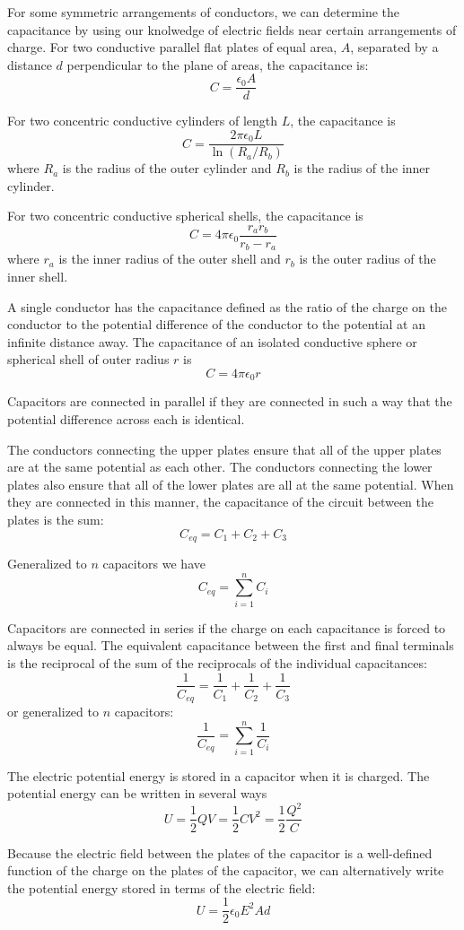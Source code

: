 \documentclass[../introphysics.tex]{subfiles}
\begin{document}
For some symmetric arrangements of conductors, we can determine the capacitance by using our knolwedge of electric fields near certain arrangements of charge.
For two conductive parallel flat plates of equal area, $A$, separated by a distance $d$ perpendicular to the plane of areas, the capacitance is:
\[C=\frac{\epsilon_0 A}{d}\]

For two concentric conductive cylinders of length $L$, the capacitance is
\[C=\frac{2\pi\epsilon_0 L}{\ln(R_a/R_b)}\]
where $R_a$ is the radius of the outer cylinder and $R_b$ is the radius of the inner cylinder.

For two concentric conductive spherical shells, the capacitance is 
\[C=4\pi\epsilon_0\frac{r_ar_b}{r_b-r_a}\]
where $r_a$ is the inner radius of the outer shell and $r_b$ is the outer radius of the inner shell.

A single conductor has the capacitance defined as the ratio of the charge on the conductor to the potential difference of the conductor to the potential at an infinite distance away. 
The capacitance of an isolated conductive sphere or spherical shell of outer radius $r$ is
\[C=4\pi\epsilon_0 r\]

Capacitors are connected in parallel if they are connected in such a way that the potential difference across each is identical.

The conductors connecting the upper plates ensure that all of the upper plates are at the same potential as each other. 
The conductors connecting the lower plates also ensure that all of the lower plates are all at the same potential. When they are connected in this manner, the capacitance of the circuit between the plates is the sum:
\[C_{eq}=C_1+C_2+C_3\]

Generalized to $n$ capacitors we have
\[C_{eq}=\sum^n_{i=1}C_i\]

Capacitors are connected in series if the charge on each capacitance is forced to always be equal. The equivalent capacitance between the first and final terminals is the reciprocal of the sum of the reciprocals of the individual capacitances:
\[\frac{1}{C_{eq}}=\frac{1}{C_1}+\frac{1}{C_2}+\frac{1}{C_3}\]
or generalized to $n$ capacitors:
\[\frac{1}{C_{eq}}=\sum^n_{i=1}\frac{1}{C_i}\]

The electric potential energy is stored in a capacitor when it is charged. The potential energy can be written in several ways
\[U=\frac{1}{2}QV=\frac{1}{2}CV^2=\frac{1}{2}\frac{Q^2}{C}\]

Because the electric field between the plates of the capacitor is a well-defined function of the charge on the plates of the capacitor, we can alternatively write the potential energy stored in terms of the electric field:
\[U=\frac{1}{2}\epsilon_0 E^2 Ad\]
\end{document}

